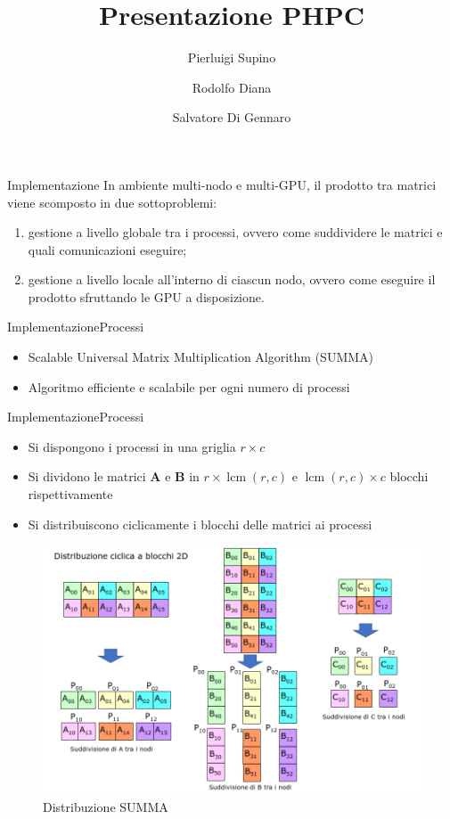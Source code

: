 \documentclass{beamer}
\title{Presentazione PHPC}
\author{Pierluigi Supino \and Rodolfo Diana \and Salvatore Di Gennaro}
\DeclareMathOperator{\lcm}{lcm}
\begin{document}
\begin{frame}
    \titlepage
\end{frame}

\begin{frame}{Implementazione}
    In ambiente multi-nodo e multi-GPU, il prodotto tra matrici viene scomposto in due sottoproblemi:
    \begin{enumerate}
        \item gestione a livello globale tra i processi, ovvero come suddividere le matrici e quali comunicazioni eseguire;
        \item gestione a livello locale all'interno di ciascun nodo, ovvero come eseguire il prodotto sfruttando le GPU a disposizione.
    \end{enumerate}
\end{frame}

\begin{frame}{Implementazione}{Processi}
    \begin{itemize}
        \item Scalable Universal Matrix Multiplication Algorithm (SUMMA)
        \item Algoritmo efficiente e scalabile per ogni numero di processi
    \end{itemize}
\end{frame}

\begin{frame}{Implementazione}{Processi}
    \begin{itemize}
        \item Si dispongono i processi in una griglia $r \times c$
        \item Si dividono le matrici $\mathbf{A}$ e $\mathbf{B}$ in $r \times \lcm(r,c)$ e $\lcm(r,c) \times c$ blocchi rispettivamente
        \item Si distribuiscono ciclicamente i blocchi delle matrici ai processi
    \end{itemize}
    \begin{figure}
        \includegraphics[width=0.5\linewidth]{imgs/summa.png}
        \caption{Distribuzione SUMMA}
    \end{figure}
\end{frame}
\end{document}
